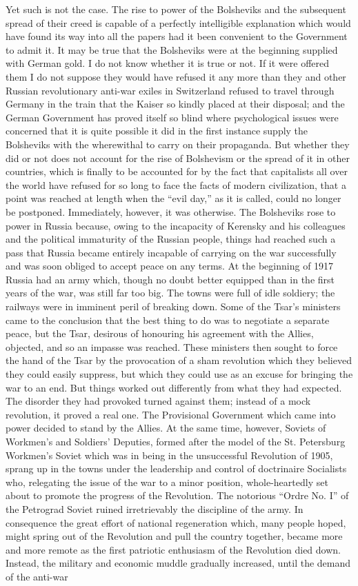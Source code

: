 \documentclass{book}
\begin{document}
Yet such is not the case. The rise to power of the Bolsheviks and the subsequent spread of their creed is capable of a perfectly intelligible explanation which would have found its way into all the papers had it been convenient to the Government to admit it. It may be true that the Bolsheviks were at the beginning supplied with German gold. I do not know whether it is true or not. If it were offered them I do not suppose they would have refused it any more than they and other Russian revolutionary anti-war exiles in Switzerland refused to travel through Germany in the train that the Kaiser so kindly placed at their disposal; and the German Government has proved itself so blind where psychological issues were concerned that it is quite possible it did in the first instance supply the Bolsheviks with the wherewithal to carry on their propaganda. But whether they did or not does not account for the rise of Bolshevism or the spread of it in other countries, which is finally to be accounted for by the fact that capitalists all over the world have refused for so long to face the facts of modern civilization, that a point was reached at length when the “evil day,” as it is called, could no longer be postponed. Immediately, however, it was otherwise. The Bolsheviks rose to power in Russia because, owing to the incapacity of Kerensky and his colleagues and the political immaturity of the Russian people, things had reached such a pass that Russia became entirely incapable of carrying on the war successfully and was soon obliged to accept peace on any terms. At the beginning of 1917 Russia had an army which, though no doubt better equipped than in the first years of the war, was still far too big. The towns were full of idle soldiery; the railways were in imminent peril of breaking down. Some of the Tsar’s ministers came to the conclusion that the best thing to do was to negotiate a separate peace, but the Tsar, desirous of honouring his agreement with the Allies, objected, and so an impasse was reached. These ministers then sought to force the hand of the Tsar by the provocation of a sham revolution which they believed they could easily suppress, but which they could use as an excuse for bringing the war to an end. But things worked out differently from what they had expected. The disorder they had provoked turned against them; instead of a mock revolution, it proved a real one. The Provisional Government which came into power decided to stand by the Allies. At the same time, however, Soviets of Workmen’s and Soldiers’ Deputies, formed after the model of the St. Petersburg Workmen’s Soviet which was in being in the unsuccessful Revolution of 1905, sprang up in the towns under the leadership and control of doctrinaire Socialists who, relegating the issue of the war to a minor position, whole-heartedly set about to promote the progress of the Revolution. The notorious “Ordre No. I” of the Petrograd Soviet ruined irretrievably the discipline of the army. In consequence the great effort of national regeneration which, many people hoped, might spring out of the Revolution and pull the country together, became more and more remote as the first patriotic enthusiasm of the Revolution died down. Instead, the military and economic muddle gradually increased, until the demand of the anti-war 
\end{document}
